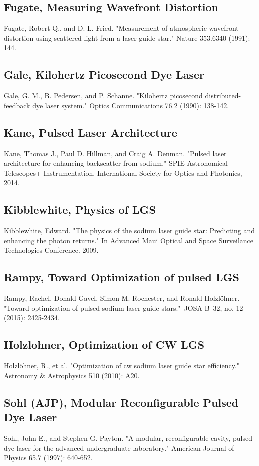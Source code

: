 \documentclass{article}
\begin{document}
\subsection{Fugate, Measuring Wavefront Distortion}
Fugate, Robert Q., and D. L. Fried. "Measurement of atmospheric wavefront distortion using scattered light from a laser guide-star." Nature 353.6340 (1991): 144.
\subsection{Gale, Kilohertz Picosecond Dye Laser}
Gale, G. M., B. Pedersen, and P. Schanne. "Kilohertz picosecond distributed-feedback dye laser system." Optics Communications 76.2 (1990): 138-142.
\subsection{Kane, Pulsed Laser Architecture}
Kane, Thomas J., Paul D. Hillman, and Craig A. Denman. "Pulsed laser architecture for enhancing backscatter from sodium." SPIE Astronomical Telescopes+ Instrumentation. International Society for Optics and Photonics, 2014.
\subsection{Kibblewhite, Physics of LGS}
Kibblewhite, Edward. "The physics of the sodium laser guide star: Predicting and enhancing the photon returns." In Advanced Maui Optical and Space Surveilance Technologies Conference. 2009.
\subsection{Rampy, Toward Optimization of pulsed LGS}
Rampy, Rachel, Donald Gavel, Simon M. Rochester, and Ronald Holzlöhner. "Toward optimization of pulsed sodium laser guide stars." JOSA B 32, no. 12 (2015): 2425-2434.
\subsection{Holzlohner, Optimization of CW LGS}
Holzlöhner, R., et al. "Optimization of cw sodium laser guide star efficiency." Astronomy \& Astrophysics 510 (2010): A20.
\subsection{Sohl (AJP), Modular Reconfigurable Pulsed Dye Laser}
Sohl, John E., and Stephen G. Payton. "A modular, reconfigurable-cavity, pulsed dye laser for the advanced undergraduate laboratory." American Journal of Physics 65.7 (1997): 640-652.
\end{document}
